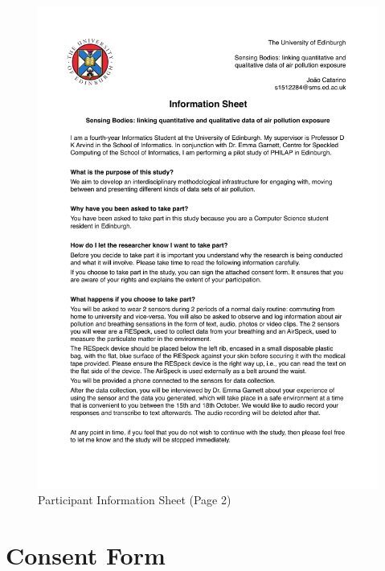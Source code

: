 \begin{figure}[H]
\centering
\includegraphics[width=\textwidth, page=2]{pdfs/information}
\caption{Participant Information Sheet (Page 2)}
\label{infosheet}
\end{figure}

\section{Consent Form}
\label{sec:consent}


